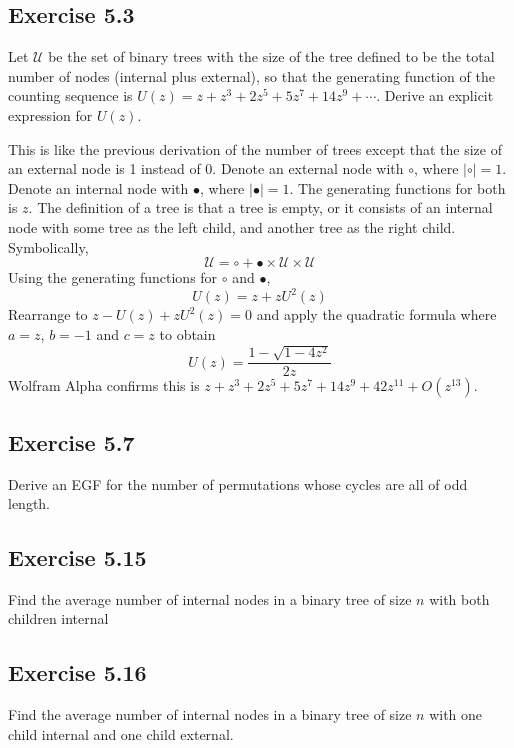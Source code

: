 \documentclass[11pt, oneside]{article}   	%
\begin{document}
\subsection*{Exercise 5.3}
Let $\mathcal{U}$ be the set of binary trees with the size of the tree defined to be the total number of nodes (internal plus external), so that
the generating function of the counting sequence is $U(z) = z + z^3 + 2z^5 + 5z^7 + 14z^9 + \cdots$. Derive an explicit expression for $U(z)$.

This is like the previous derivation of the number of trees except that the size of an external node is 1 instead of 0. Denote an external node
with $\circ$, where $\left| \circ \right| = 1$. Denote an internal node with $\bullet$, where $\left| \bullet \right| = 1$.  The generating functions for
both is $z$. The definition of a tree is that a tree is empty, or it consists of an internal node with some tree as the left child, and another tree as the right child.
Symbolically,
\[
	\mathcal{U} = \circ + \bullet \times \mathcal{U} \times \mathcal{U}
\]
Using the generating functions for $\circ$ and $\bullet$,
\[
	U(z) = z + zU^2(z)
\]
Rearrange to $z - U(z) + zU^2(z) = 0$ and apply the quadratic formula where $a=z$, $b=-1$ and $c=z$ to obtain
\[
	U(z) = \frac{1-\sqrt{1-4z^2}}{2z}
\]
Wolfram Alpha confirms this is $z + z^3 + 2z^5 + 5z^7 + 14z^9 + 42z^{11} + O(z^{13})$.

\subsection*{Exercise 5.7}
Derive an EGF for the number of permutations whose cycles are all of odd length.

\subsection*{Exercise 5.15}
Find the average number of internal nodes in a binary tree of size $n$ with both children internal

\subsection*{Exercise 5.16}
Find the average number of internal nodes in a binary tree of size $n$ with one child internal and one child external.
\end{document}
